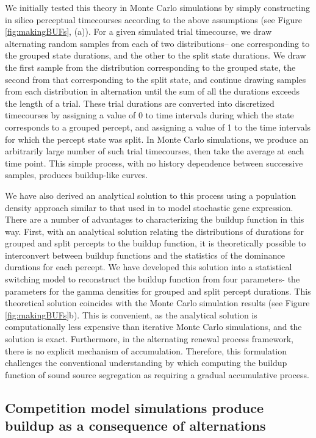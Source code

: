 \documentclass{frontiersSCNS} %
\begin{document}
We initially tested this theory in Monte Carlo simulations by simply constructing in silico perceptual timecourses according to the above assumptions (see Figure \ref{fig:makingBUFs}, (a)). For a given simulated trial timecourse, we draw alternating random samples from each of two distributions-- one corresponding to the grouped state durations, and the other to the split state durations. We draw the first sample from the distribution corresponding to the grouped state, the second from that corresponding to the split state, and continue drawing samples from each distribution in alternation until the sum of all the durations exceeds the length of a trial. These trial durations are converted into discretized timecourses by assigning a value of 0 to time intervals during which the state corresponds to a grouped percept, and assigning a value of 1 to the time intervals for which the percept state was split. In Monte Carlo simulations, we produce an arbitrarily large number of such trial timecourses, then take the average at each time point. This simple process, with no history dependence between successive samples, produces buildup-like curves.

We have also derived an analytical solution to this process using a population density approach similar to that used in \cite{Stinchcombe2012} to model stochastic gene expression. There are a number of advantages to characterizing the buildup function in this way. First, with an analytical solution relating the distributions of durations for grouped and split percepts to the buildup function, it is theoretically possible to interconvert between buildup functions and the statistics of the dominance durations for each percept. We have developed this solution into a statistical switching model to reconstruct the buildup function from four parameters- the parameters for the gamma densities for grouped and split percept durations. This theoretical solution coincides with the Monte Carlo simulation results  (see Figure \ref{fig:makingBUFs}b). This is convenient, as the analytical solution is computationally less expensive than iterative Monte Carlo simulations, and the solution is exact. Furthermore, in the alternating renewal process framework, there is no explicit mechanism of accumulation. Therefore, this formulation challenges the conventional understanding by which computing the buildup function of sound source segregation as requiring a gradual accumulative process.

\subsection{Competition model simulations produce buildup as a consequence of alternations} 
\end{document}
